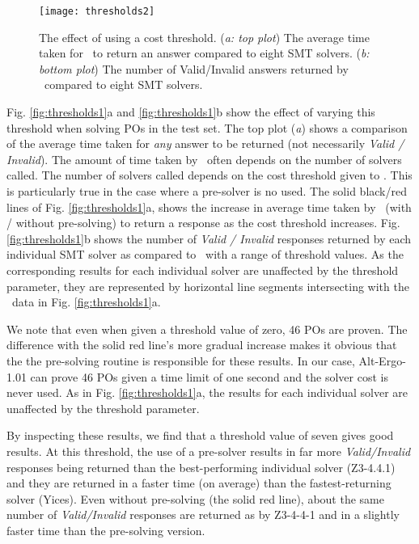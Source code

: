 \begin{figure}
	\centering
	\texttt{[image: thresholds2]}
	\caption[The effect of using a cost threshold]{The effect of using a cost threshold. (\textit{a: top plot}) The average time taken for \where~to return an answer compared to eight SMT solvers. (\textit{b: bottom plot}) The number of Valid/Invalid answers returned by \where~compared to eight SMT solvers.}
	\label{fig:thresholds2}
\end{figure}



Fig. \ref{fig:thresholds1}a and \ref{fig:thresholds1}b show the effect of varying this threshold when solving POs in the test set.
The top plot (\textit{a}) shows a comparison of the average time taken for \textit{any} answer to be returned (not necessarily \textit{Valid / Invalid}).
The amount of time taken by \where~often depends on the number of solvers called.
The number of solvers called depends on the cost threshold given to \where.
This is particularly true in the case where a pre-solver is no used. 
The solid black/red lines of Fig. \ref{fig:thresholds1}a, shows the increase in average time taken by \where~(with / without pre-solving) to return a response as the cost threshold increases.
Fig. \ref{fig:thresholds1}b shows the number of \textit{Valid / Invalid} responses returned by each individual SMT solver as compared to \where~with a range of threshold values.
As the corresponding results for each individual solver are unaffected by the threshold parameter, they are represented by horizontal line segments intersecting with the \where~data in Fig. \ref{fig:thresholds1}a.

We note that even when given a threshold value of zero, 46 POs are proven.
The difference with the solid red line's more gradual increase makes it obvious that the the pre-solving routine is responsible for these results.
In our case, Alt-Ergo-1.01 can prove 46 POs given a time limit of one second and the solver cost is never used.
As in Fig. \ref{fig:thresholds1}a, the results for each individual solver are unaffected by the threshold parameter.

By inspecting these results, we find that a threshold value of seven gives good results.
At this threshold, the use of a pre-solver results in far more \textit{Valid/Invalid} responses being returned than the best-performing individual solver (Z3-4.4.1) and they are returned in a faster time (on average) than the fastest-returning solver (Yices).
Even without pre-solving (the solid red line), about the same number of \textit{Valid/Invalid} responses are returned as by Z3-4-4-1 and in a slightly faster time than the pre-solving version. 

